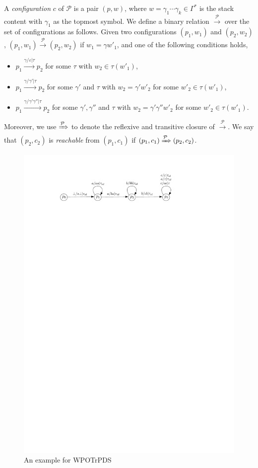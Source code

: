 \documentclass[preprint,12pt]{elsarticle}
\newcommand\Pp{{\mathcal{P} }}
\newcommand\TranSet{{\mathscr{T} }}
\newcommand{\WOTrPDS}{\textsf{WPOTrPDS}}
\begin{document}
A \emph{configuration} $c$ of $\Pp$ is a pair $(p, w)$, where $w = \gamma_1 \cdots \gamma_k \in \Gamma^*$ is the  stack content with $\gamma_1$ as the topmost symbol. We define a binary relation $\xrightarrow{\Pp}$ over the set of configurations as follows. Given two configurations $(p_1, w_1)$ and $(p_2, w_2)$, $(p_1, w_1) \xrightarrow{\Pp} (p_2, w_2)$ if $w_1 = \gamma w'_1$, and one of the following conditions holds,
\begin{itemize}
\item $p_1 \xrightarrow{\gamma/\varepsilon|\tau} p_2$ for some $\tau$ with  $w_2 \in \tau(w'_1)$, 
%
\item $p_1 \xrightarrow{\gamma/\gamma'|\tau} p_2$ for some $\gamma'$ and $\tau$ with $w_2 = \gamma' w'_2$ for some $w'_2 \in \tau(w'_1)$, 
%
\item $p_1 \xrightarrow{\gamma/\gamma' \gamma''|\tau} p_2$ for some $\gamma', \gamma''$ and $\tau$ with $w_2 = \gamma' \gamma'' w'_2$ for some $w'_2 \in \tau(w'_1)$.
\end{itemize}
Moreover, we use $\xRightarrow{\Pp}$ to denote the reflexive and transitive closure of $\xrightarrow{\Pp}$. We say that $(p_2, c_2)$ is \emph{reachable} from $(p_1, c_1)$ if $(p_1, c_1) \xRightarrow{\Pp} (p_2, c_2)$.
\begin{figure}[htb]
    \centering
	\includegraphics[scale = 0.9]{wstrpds-example.pdf}
	\caption{An example for \WOTrPDS}\label{fig-wstrpds-exmp}
\end{figure}
\end{document}
